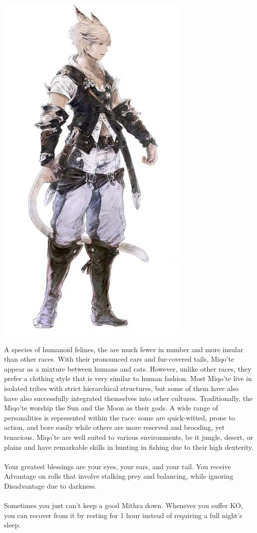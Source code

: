 \begin{center} \includegraphics[width=0.7\columnwidth]{./art/races/miqote.jpg} \end{center}
%
A species of humanoid felines, the  are much fewer in number and more insular than other races. 
With their pronounced ears and fur-covered tails, Miqo'te appear as a mixture between humans and cats.
However, unlike other races, they prefer a clothing style that is very similar to human fashion.
Most Miqo'te live in isolated tribes with strict hierarchical structures, but some of them have also have also successfully integrated themselves into other cultures.
Traditionally, the Miqo'te worship the Sun and the Moon as their gods.
A wide range of personalities is represented within the race: some are quick-witted, prone to action, and bore easily while others are more reserved and brooding, yet tenacious. 
Miqo'te are well suited to various environments, be it jungle, desert, or plains and have remarkable skills in hunting in fishing due to their high dexterity.
\\\\
 Your greatest blessings are your eyes, your ears, and your tail. 
You receive Advantage on rolls that involve stalking prey and balancing, while ignoring Disadvantage due to darkness.
\\\\
 Sometimes you just can't keep a good Mithra down. 
Whenever you suffer KO, you can recover from it by resting for 1 hour instead of requiring a full night's sleep.
%
%
\clearpage
